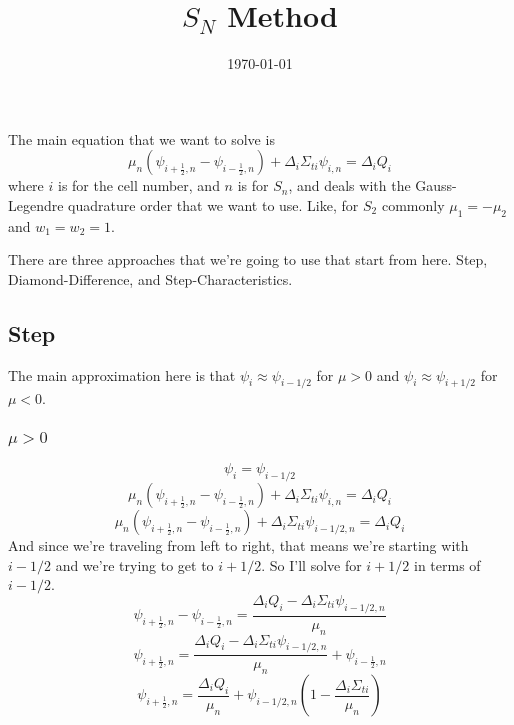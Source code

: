 \documentclass[a4paper]{article}
\title{$S_N$ Method}
\date{\today}
\begin{document}
\maketitle



The main equation that we want to solve is 
\[\mu_{n}\left(\psi_{i+\frac{1}{2},n}-\psi_{i-\frac{1}{2},n}\right)+\Delta_{i}\Sigma_{ti}\psi_{i,n}=\Delta_{i}Q_{i}\]
where $i$ is for the cell number, and $n$ is for $S_n$, and deals with the Gauss-Legendre quadrature order that we want to use. Like, for $S_2$ commonly $\mu_1=-\mu_2$ and $w_1=w_2=1$. 
 
 There are three approaches that we're going to use that start from here. Step, Diamond-Difference, and Step-Characteristics.
 \subsection*{Step}
 The main approximation here is that $\psi_i\approx\psi_{i-1/2}$ for $\mu>0$ and $\psi_i\approx\psi_{i+1/2}$ for $\mu<0$.
 \subsubsection*{$\mu>0$}
 \[\psi_i=\psi_{i-1/2}\]
\[\mu_n\left(\psi_{i+\frac{1}{2},n}-\psi_{i-\frac{1}{2},n}\right)+\Delta_i\Sigma_{ti}\psi_{i,n}=\Delta_iQ_i\]
\[\mu_n\left(\psi_{i+\frac{1}{2},n}-\psi_{i-\frac{1}{2},n}\right)+\Delta_i\Sigma_{ti}\psi_{i-1/2,n}=\Delta_iQ_i\]
And since we're traveling from left to right, that means we're starting with $i-1/2$ and we're trying to get to $i+1/2$. So I'll solve for $i+1/2$ in terms of $i-1/2$.
\[\psi_{i+\frac{1}{2},n}-\psi_{i-\frac{1}{2},n}=\frac{\Delta_iQ_i-\Delta_i\Sigma_{ti}\psi_{i-1/2,n}}{\mu_n}\]
\[\psi_{i+\frac{1}{2},n}=\frac{\Delta_iQ_i-\Delta_i\Sigma_{ti}\psi_{i-1/2,n}}{\mu_n}+\psi_{i-\frac{1}{2},n}\]
\[\boxed{\psi_{i+\frac{1}{2},n}=\frac{\Delta_iQ_i}{\mu_n}+\psi_{i-1/2,n}\left(1-\frac{\Delta_i\Sigma_{ti}}{\mu_n}\right)}\]
\end{document}

